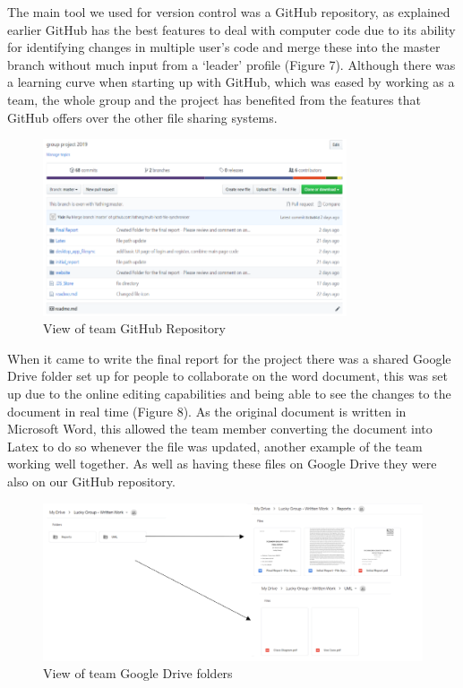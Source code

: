 \documentclass[11pt]{article}
\begin{document}
The main tool we used for version control was a GitHub repository, as explained earlier GitHub has the best features to deal with computer code due to its ability for identifying changes in multiple user’s code and merge these into the master branch without much input from a ‘leader’ profile (Figure 7). Although there was a learning curve when starting up with GitHub, which was eased by working as a team, the whole group and the project has benefited from the features that GitHub offers over the other file sharing systems.

\begin{figure} [H]
\caption{View of team GitHub Repository}
\centering
\includegraphics[width=0.8\textwidth]{figure1-1.PNG}
\end{figure}

When it came to write the final report for the project there was a shared Google Drive folder set up for people to collaborate on the word document, this was set up due to the online editing capabilities and being able to see the changes to the document in real time (Figure 8). As the original document is written in Microsoft Word, this allowed the team member converting the document into Latex to do so whenever the file was updated, another example of the team working well together. As well as having these files on Google Drive they were also on our GitHub repository.

\begin{figure} [H]
\caption{View of team Google Drive folders}
\centering
\includegraphics[width=1.0\textwidth]{figure2.PNG}
\end{figure}
\end{document}
